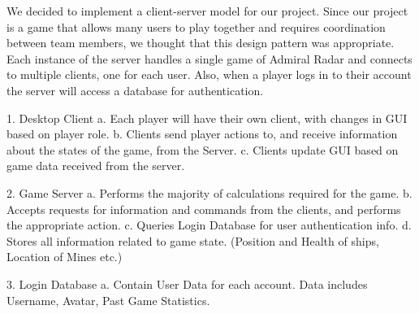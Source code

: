 We decided to implement a client-server model for our project. Since our project is a game that allows many users to play together and requires coordination between team members, we thought that this design pattern was appropriate. Each instance of the server handles a single game of Admiral Radar and connects to multiple clients, one for each user. Also,  when a player logs in to their account the server will access a database for authentication.

1.	Desktop Client
a. Each player will have their own client, with changes in GUI based on player role.
b. Clients send player actions to, and receive information about the states of the game, from the Server.
c. Clients update GUI based on game data received from the server.

2.	Game Server
a. Performs the majority of calculations required for the game.
b. Accepts requests for information and commands from the clients, and performs the appropriate action.
c. Queries Login Database for user authentication info.
d. Stores all information related to game state. (Position and Health of ships, Location of Mines etc.)

3.	Login Database
a. Contain User Data for each account. Data includes Username, Avatar, Past Game Statistics.
